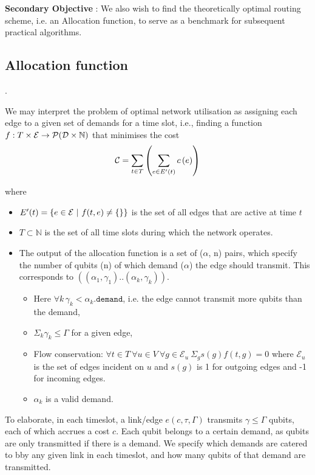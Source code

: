 \documentclass{amsart}
\begin{document}
    \textbf{Secondary Objective} : We also wish to find the theoretically optimal routing scheme, i.e. an Allocation function, to serve as a benchmark for subsequent practical algorithms.
    
    \subsection{Allocation function}.

    We may interpret the problem of optimal network utilisation as assigning each edge to a given set of demands for a time slot, i.e., finding a function \(f : T \times \mathcal{E} \rightarrow \mathcal{P}(\mathcal{D \times \mathbb{N}})\) that minimises the cost 
        \[\mathcal{C} = \sum_{t \in T} \left(\sum_{e \in E'(t)} c\left(e\right)\right)\]


    where \begin{itemize}
        \item \(E'(t) = \left\{e \in \mathcal{E} \ |\  f(t, e) \neq \{\} \right\}\) is the set of all edges that are active at time \(t\)
        \item \(T \subset \mathbb{N}\) is the set of all time slots during which the network operates.
        \item The output of the allocation function is a set of (\(\alpha\), n) pairs, which specify the number of qubits (n) of which demand (\(\alpha\)) the edge should transmit. This corresponds to \(((\alpha_1, \gamma_1)..(\alpha_k, \gamma_k))\).
         \begin{itemize}
            \item  Here \(\forall k\, \gamma_k < \alpha_k\texttt{.demand}\), i.e. the edge cannot transmit more qubits than the demand,
            \item \(\Sigma_k \gamma_k \leq \Gamma\) for a given edge, 
            \item Flow conservation: \(\forall t \in T\ \forall u \in V\ \forall g \in \mathcal{E}_u\  \Sigma_g s(g)f(t, g) = 0\) where \(\mathcal{E}_u\) is the set of edges incident on \(u\) and \(s(g)\) is 1 for outgoing edges and -1 for incoming edges.
            \item \(\alpha_k\) is a valid demand.
        \end{itemize}
    \end{itemize}

    To elaborate, in each timeslot, a link/edge \(e(c, \tau ,\Gamma)\) transmits \(\gamma \leq \Gamma\) qubits, each of which accrues a cost \(c\). Each qubit belongs to a certain demand, as qubits are only transmitted if there is a demand. We specify which demands are catered to bby any given link in each timeslot, and how many qubits of that demand are transmitted.
\end{document}
